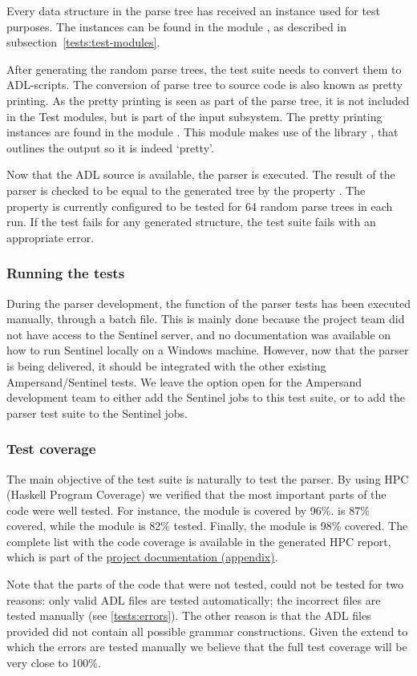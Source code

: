   Every data structure in the parse tree has received an  instance used for test purposes.
  The instances can be found in the module , as described in subsection~\ref{tests:test-modules}.
  
  After generating the random parse trees, the test suite needs to convert them to ADL-scripts.
  The conversion of parse tree to source code is also known as pretty printing.
  As the pretty printing is seen as part of the parse tree, it is not included in the Test modules, but is part of the input subsystem.
  The pretty printing instances are found in the module .
  This module makes use of the library , that outlines the output so it is indeed `pretty'.
  
  Now that the ADL source is available, the parser is executed.
  The result of the parser is checked to be equal to the generated tree by the property .
  The property is currently configured to be tested for 64 random parse trees in each run.
  If the test fails for any generated structure, the test suite fails with an appropriate error.
  
  \subsubsection{Running the tests}
  During the parser development, the  function of the parser tests has been executed manually, through a batch file.
  This is mainly done because the project team did not have access to the Sentinel server, and no documentation was available on how to run Sentinel locally on a Windows machine.
  However, now that the parser is being delivered, it should be integrated with the other existing Ampersand/Sentinel tests.
  We leave the option open for the Ampersand development team to either add the Sentinel jobs to this test suite, or to add the parser test suite to the Sentinel jobs.
  
  \subsubsection{Test coverage}
  The main objective of the test suite is naturally to test the parser.
  By using HPC (Haskell Program Coverage) we verified that the most important parts of the code were well tested.
  For instance, the  module is covered by 96\%.
   is 87\% covered, while the module  is 82\% tested.
  Finally, the module  is 98\% covered.
  The complete list with the code coverage is available in the generated HPC report, which is part of the \hyperref[app:docs]{project documentation (appendix)}.
  
  Note that the parts of the code that were not tested, could not be tested for two reasons: only valid ADL files are tested automatically; the incorrect files are tested manually (see \autoref{tests:errors}).
  The other reason is that the ADL files provided did not contain all possible grammar constructions.
  Given the extend to which the errors are tested manually we believe that the full test coverage will be very close to 100\%.
  